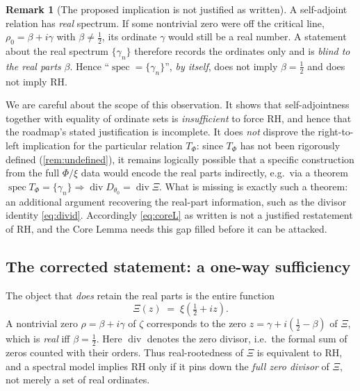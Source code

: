 \documentclass[12pt,a4paper]{amsart}
\theoremstyle{plain}
\theoremstyle{definition}
\newtheorem{remark}[theorem]{Remark}
\begin{document}
\begin{remark}[The proposed implication is not justified as
written]\label{rem:coreL-defective}
  A self-adjoint relation has \emph{real} spectrum.  If some nontrivial
  zero were off the critical line, $\rho_0=\beta+i\gamma$ with
  $\beta\neq\tfrac12$, its ordinate $\gamma$ would still be a real number.
  A statement about the real spectrum $\{\gamma_n\}$ therefore records the
  ordinates only and is \emph{blind to the real parts} $\beta$.  Hence
  ``$\operatorname{spec}=\{\gamma_n\}$'', \emph{by itself}, does not imply
  $\beta=\tfrac12$ and does not imply RH.

  We are careful about the scope of this observation.  It shows that
  self-adjointness together with equality of ordinate sets is
  \emph{insufficient} to force RH, and hence that the roadmap's stated
  justification is incomplete.  It does \emph{not} disprove the
  right-to-left implication for the particular relation $T_\Phi$: since
  $T_\Phi$ has not been rigorously defined (\cref{rem:undefined}), it
  remains logically possible that a specific construction from the full
  $\Phi/\xi$ data would encode the real parts indirectly, e.g.\ via a
  theorem
  $\operatorname{spec}T_\Phi=\{\gamma_n\}\Rightarrow
   \operatorname{div}D_{\theta_0}=\operatorname{div}\Xi$.  What is
  missing is exactly such a theorem: an additional argument recovering the
  real-part information, such as the divisor identity \cref{eq:divid}.
  Accordingly \cref{eq:coreL} as written is not a justified restatement of
  RH, and the Core Lemma needs this gap filled before it can be attacked.
\end{remark}

\subsection{The corrected statement: a one-way sufficiency}

The object that \emph{does} retain the real parts is the entire function
\begin{equation}\label{eq:Xi}
  \Xi(z) \;=\; \xi\!\left(\tfrac12+iz\right).
\end{equation}
A nontrivial zero $\rho=\beta+i\gamma$ of $\zeta$ corresponds to the zero
$z=\gamma+i(\tfrac12-\beta)$ of $\Xi$, which is \emph{real} iff
$\beta=\tfrac12$.  Here $\operatorname{div}$ denotes the zero divisor,
i.e.\ the formal sum of zeros counted with their orders.  Thus
real-rootedness of $\Xi$ is equivalent to RH, and a spectral model implies
RH only if it pins down the \emph{full zero divisor} of $\Xi$, not merely
a set of real ordinates.
\end{document}
